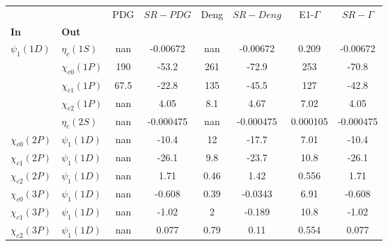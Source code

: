 \begin{tabular}{l|l|c|c|c|c|c|c}
\toprule
                &                &  PDG &  $SR-PDG$ &  Deng & $SR-Deng$ &  E1-$\Gamma$ & $SR-\Gamma$ \\
\textbf{In} & \textbf{Out} &      &           &       &           &              &             \\
\midrule
\textbf{$\psi_{1}(1D)$} & \textbf{$\eta_{c}(1S)$} &  nan &  -0.00672 &   nan &  -0.00672 &        0.209 &    -0.00672 \\
                & \textbf{$\chi_{c0}(1P)$} &  190 &     -53.2 &   261 &     -72.9 &          253 &       -70.8 \\
                & \textbf{$\chi_{c1}(1P)$} & 67.5 &     -22.8 &   135 &     -45.5 &          127 &       -42.8 \\
                & \textbf{$\chi_{c2}(1P)$} &  nan &      4.05 &   8.1 &      4.67 &         7.02 &        4.05 \\
                & \textbf{$\eta_{c}(2S)$} &  nan & -0.000475 &   nan & -0.000475 &     0.000105 &   -0.000475 \\
\textbf{$\chi_{c0}(2P)$} & \textbf{$\psi_{1}(1D)$} &  nan &     -10.4 &    12 &     -17.7 &         7.01 &       -10.4 \\
\textbf{$\chi_{c1}(2P)$} & \textbf{$\psi_{1}(1D)$} &  nan &     -26.1 &   9.8 &     -23.7 &         10.8 &       -26.1 \\
\textbf{$\chi_{c2}(2P)$} & \textbf{$\psi_{1}(1D)$} &  nan &      1.71 &  0.46 &      1.42 &        0.556 &        1.71 \\
\textbf{$\chi_{c0}(3P)$} & \textbf{$\psi_{1}(1D)$} &  nan &    -0.608 &  0.39 &   -0.0343 &         6.91 &      -0.608 \\
\textbf{$\chi_{c1}(3P)$} & \textbf{$\psi_{1}(1D)$} &  nan &     -1.02 &     2 &    -0.189 &         10.8 &       -1.02 \\
\textbf{$\chi_{c2}(3P)$} & \textbf{$\psi_{1}(1D)$} &  nan &     0.077 &  0.79 &      0.11 &        0.554 &       0.077 \\
\bottomrule
\end{tabular}
